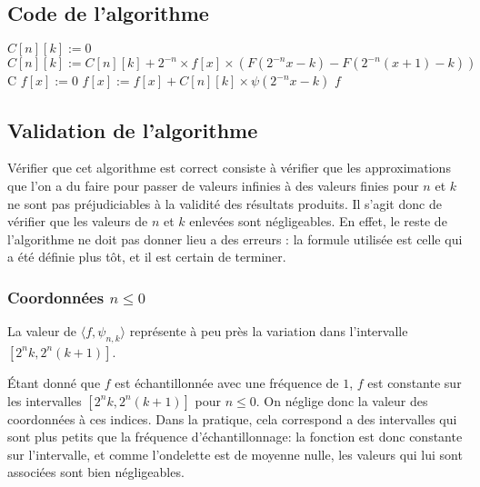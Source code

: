 \documentclass[]{article}
\theoremstyle{remark}
\theoremstyle{definition}
\begin{document}
\subsection{Code de l'algorithme}
\begin{algorithm}
	\begin{algorithmic}[1]
		\State $C[n][k] := 0$
		\State $C[n][k] := C[n][k] + 2^{-n}\times f[x]\times\left(F(2^{-n}x-k)-F(2^{-n}(x+1)-k)\right)$
		\EndFor
		\EndFor
		\EndFor
		\State \Return C
		\EndProcedure
		\Statex
		\State $f[x] := 0$
		\State $f[x] := f[x] + C[n][k]\times\psi(2^{-n}x-k)$
		\EndFor
		\EndFor
		\EndFor
		\State \Return $f$
		\EndProcedure
	\end{algorithmic}
\end{algorithm}

\subsection{Validation de l'algorithme}

Vérifier que cet algorithme est correct consiste à vérifier que les approximations que l'on a du faire pour passer de valeurs infinies à des valeurs finies pour $n$ et $k$ ne sont pas préjudiciables à la validité des résultats produits. Il s'agit donc de vérifier que les valeurs de $n$ et $k$ enlevées sont négligeables. En effet,  le reste de l'algorithme ne doit pas donner lieu a des erreurs : la formule utilisée est celle qui a été définie plus tôt, et il est certain de terminer. 


\subsubsection{Coordonnées $n\le 0$}

La valeur de $\langle f,\psi_{n,k}\rangle$ représente à peu près la variation dans l'intervalle $[2^{n}k,2^{n}(k+1)]$.

Étant donné que $f$ est échantillonnée avec une fréquence de $1$, $f$ est constante sur les intervalles $[2^{n}k,2^{n}(k+1)]$ pour $n\le 0$. On néglige donc la valeur des coordonnées à ces indices.
Dans la pratique, cela correspond a des intervalles qui sont plus petits que la fréquence d'échantillonnage: la fonction est donc constante sur l'intervalle, et comme l'ondelette est de moyenne nulle, les valeurs qui lui sont associées sont bien négligeables. 
\end{document}
